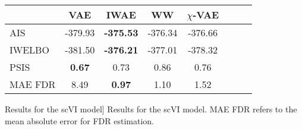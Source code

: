\begin{center}
\begin{small}
\begin{tabular}{lccccccc}
\toprule
 & \textbf{VAE}  & \textbf{IWAE} & \textbf{WW} & \textbf{$\chi$-VAE} \\ \midrule
 AIS & -379.93 & \textbf{-375.53} & -376.34 & -376.66 \\
IWELBO  & -381.50 & \textbf{-376.21} & -377.01 & -378.32\\
\midrule
PSIS  & \textbf{0.67} & 0.73 & 0.86 & 0.76\\
\midrule
MAE FDR & 8.49 & \textbf{0.97} & 1.10 & 1.52 \\
\bottomrule
\end{tabular}
\end{small}
\end{center}
\caption
[Results for the scVI model]{\label{table_fdr}
Results for the scVI model. MAE FDR refers to the mean absolute error for FDR estimation.}
